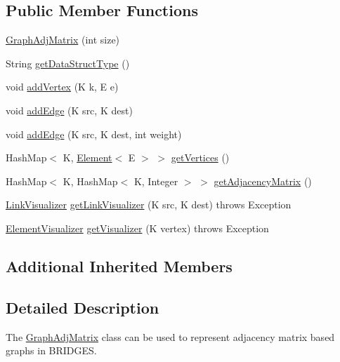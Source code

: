 \subsection*{Public Member Functions}
\begin{DoxyCompactItemize}
\item 
\hyperlink{classbridges_1_1base_1_1_graph_adj_matrix_aaf71e89e2239d42f3ef37570665fb49d}{Graph\+Adj\+Matrix} (int size)
\item 
String \hyperlink{classbridges_1_1base_1_1_graph_adj_matrix_aa837a6bd0afbc700bf6277a062c5fdae}{get\+Data\+Struct\+Type} ()
\item 
void \hyperlink{classbridges_1_1base_1_1_graph_adj_matrix_a67d24d2ae069a8e1de6179ed58d7bca5}{add\+Vertex} (K k, E e)
\item 
void \hyperlink{classbridges_1_1base_1_1_graph_adj_matrix_ae4efc51cb444527f3915af5a45f73474}{add\+Edge} (K src, K dest)
\item 
void \hyperlink{classbridges_1_1base_1_1_graph_adj_matrix_af028f90cb574845cdddf9e5ec05130f8}{add\+Edge} (K src, K dest, int weight)
\item 
Hash\+Map$<$ K, \hyperlink{classbridges_1_1base_1_1_element}{Element}$<$ E $>$ $>$ \hyperlink{classbridges_1_1base_1_1_graph_adj_matrix_ac8270b3cbc4cf5f2f03c555ac6055423}{get\+Vertices} ()
\item 
Hash\+Map$<$ K, Hash\+Map$<$ K, Integer $>$ $>$ \hyperlink{classbridges_1_1base_1_1_graph_adj_matrix_a2bf0bf69333497b3b97788b74fe1f5b7}{get\+Adjacency\+Matrix} ()
\item 
\hyperlink{classbridges_1_1base_1_1_link_visualizer}{Link\+Visualizer} \hyperlink{classbridges_1_1base_1_1_graph_adj_matrix_a39b5bbfa58479f456334703232a90e43}{get\+Link\+Visualizer} (K src, K dest)  throws Exception 
\item 
\hyperlink{classbridges_1_1base_1_1_element_visualizer}{Element\+Visualizer} \hyperlink{classbridges_1_1base_1_1_graph_adj_matrix_a77033de62dbccd27dac17b09d44f89b5}{get\+Visualizer} (K vertex)  throws Exception 
\end{DoxyCompactItemize}
\subsection*{Additional Inherited Members}


\subsection{Detailed Description}
The \hyperlink{classbridges_1_1base_1_1_graph_adj_matrix}{Graph\+Adj\+Matrix} class can be used to represent adjacency matrix based graphs in B\+R\+I\+D\+G\+ES. 

